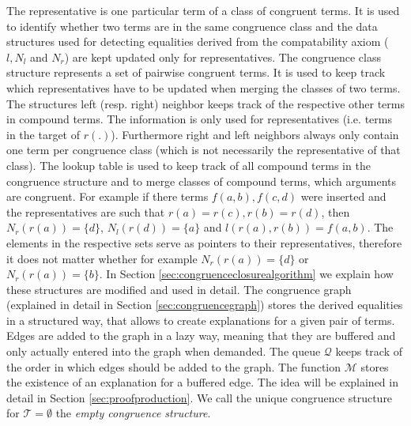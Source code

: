 The representative is one particular term of a class of congruent terms.
It is used to identify whether two terms are in the same congruence class and the data structures used for detecting equalities derived from the compatability axiom ($l, N_l$ and $N_r$) are kept updated only for representatives.
The congruence class structure represents a set of pairwise congruent terms.
It is used to keep track which representatives have to be updated when merging the classes of two terms.
The structures left (resp. right) neighbor keeps track of the respective other terms in compound terms.
The information is only used for representatives (i.e. terms in the target of $r(.)$).
Furthermore right and left neighbors always only contain one term per congruence class (which is not necessarily the representative of that class).
The lookup table is used to keep track of all compound terms in the congruence structure and to merge classes of compound terms, which arguments are congruent.
For example if there terms $f(a,b),f(c,d)$ were inserted and the representatives are such that $r(a) = r(c), r(b) = r(d)$, then $N_r(r(a)) = \{d\}$, $N_l(r(d)) = \{a\}$ and $l(r(a),r(b)) = f(a,b)$.
The elements in the respective sets serve as pointers to their representatives, therefore it does not matter whether for example $N_r(r(a)) = \{d\}$ or $N_r(r(a)) = \{b\}$.
In Section \ref{sec:congruenceclosurealgorithm} we explain how these structures are modified and used in detail.
The congruence graph (explained in detail in Section \ref{sec:congruencegraph}) stores the derived equalities in a structured way, that allows to create explanations for a given pair of terms.
Edges are added to the graph in a lazy way, meaning that they are buffered and only actually entered into the graph when demanded.
The queue $\mathcal{Q}$ keeps track of the order in which edges should be added to the graph.
The function $\mathcal{M}$ stores the existence of an explanation for a buffered edge.
The idea will be explained in detail in Section \ref{sec:proofproduction}.
We call the unique congruence structure for $\mathcal{T} = \emptyset$ the \emph{empty congruence structure}.

\FloatBarrier

